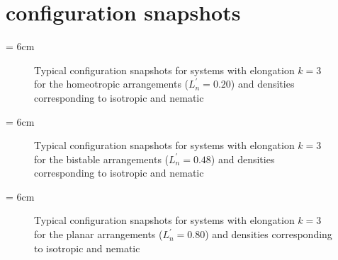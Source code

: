 \chapter{configuration snapshots}




\picW = 6cm
\begin{figure}[h]
        \centering
	\caption{Typical configuration snapshots for systems with elongation $k=3$ for the homeotropic
	arrangements ($L^{'}_n =0.20$) and densities corresponding to isotropic and nematic}
        \label{fig:typicalSnaps_k3_homeo}
\end{figure}


\picW = 6cm
\begin{figure}[h]
        \centering


	\caption{Typical configuration snapshots for systems with elongation $k=3$ for the bistable
	arrangements ($L^{'}_n =0.48$) and densities corresponding to isotropic and nematic}
        \label{fig:typicalSnaps_k3_bist}
\end{figure}

\picW = 6cm
\begin{figure}[h]
        \centering
	\caption{Typical configuration snapshots for systems with elongation $k=3$ for the planar
	arrangements ($L^{'}_n =0.80$) and densities corresponding to isotropic and nematic}
        \label{fig:typicalSnaps_k3_planar}
\end{figure}


